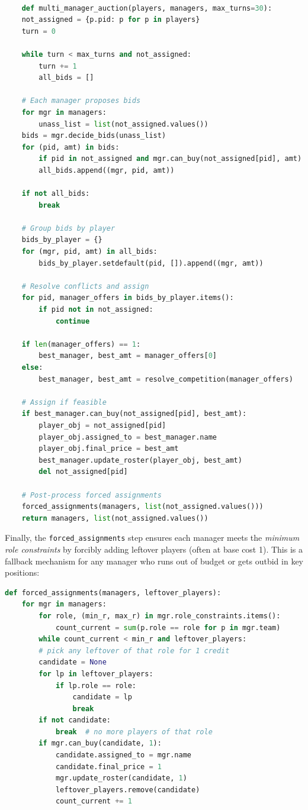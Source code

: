 \documentclass[sigconf]{acmart}
\begin{document}
	\begin{lstlisting}[language=Python, caption=Multi-manager auction framework]

	def multi_manager_auction(players, managers, max_turns=30):
	not_assigned = {p.pid: p for p in players}
	turn = 0
	
	while turn < max_turns and not_assigned:
		turn += 1
		all_bids = []
	
	# Each manager proposes bids
	for mgr in managers:
		unass_list = list(not_assigned.values())
	bids = mgr.decide_bids(unass_list)
	for (pid, amt) in bids:
		if pid in not_assigned and mgr.can_buy(not_assigned[pid], amt):
		all_bids.append((mgr, pid, amt))
	
	if not all_bids:
		break
	
	# Group bids by player
	bids_by_player = {}
	for (mgr, pid, amt) in all_bids:
		bids_by_player.setdefault(pid, []).append((mgr, amt))
	
	# Resolve conflicts and assign
	for pid, manager_offers in bids_by_player.items():
		if pid not in not_assigned:
			continue
	
	if len(manager_offers) == 1:
		best_manager, best_amt = manager_offers[0]
	else:
		best_manager, best_amt = resolve_competition(manager_offers)
	
	# Assign if feasible
	if best_manager.can_buy(not_assigned[pid], best_amt):
		player_obj = not_assigned[pid]
		player_obj.assigned_to = best_manager.name
		player_obj.final_price = best_amt
		best_manager.update_roster(player_obj, best_amt)
		del not_assigned[pid]
	
	# Post-process forced assignments
	forced_assignments(managers, list(not_assigned.values()))
	return managers, list(not_assigned.values())
\end{lstlisting}

	
	Finally, the \texttt{forced\_assignments} step ensures each manager meets the \emph{minimum role constraints} by forcibly adding leftover players (often at base cost 1). This is a fallback mechanism for any manager who runs out of budget or gets outbid in key positions:
	
	\begin{lstlisting}[language=Python, caption=Simple forced assignment to fill leftover roles]
def forced_assignments(managers, leftover_players):
	for mgr in managers:
		for role, (min_r, max_r) in mgr.role_constraints.items():
			count_current = sum(p.role == role for p in mgr.team)
		while count_current < min_r and leftover_players:
		# pick any leftover of that role for 1 credit
		candidate = None
		for lp in leftover_players:
			if lp.role == role:
				candidate = lp
				break
		if not candidate:
			break  # no more players of that role
		if mgr.can_buy(candidate, 1):
			candidate.assigned_to = mgr.name
			candidate.final_price = 1
			mgr.update_roster(candidate, 1)
			leftover_players.remove(candidate)
			count_current += 1
	\end{lstlisting}
	
\end{document}
